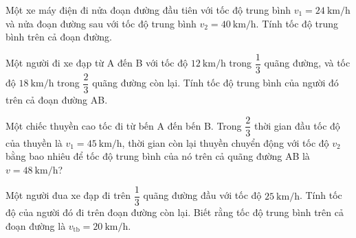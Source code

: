 \begin{ex}
	Một xe máy điện đi nửa đoạn đường đầu tiên với tốc độ trung bình $v_1 = \SI{24}{\kilo\meter/\hour}$ và nửa đoạn đường sau với tốc độ trung bình $v_2 = \SI{40}{\kilo\meter/\hour}$. Tính tốc độ trung bình trên cả đoạn đường.
\end{ex}

\begin{ex}
	Một người đi xe đạp từ A đến B với tốc độ $\SI{12}{\kilo\meter/\hour}$ trong $\dfrac{1}{3}$ quãng đường, và tốc độ $\SI{18}{\kilo\meter/\hour}$ trong $\dfrac{2}{3}$ quãng đường còn lại. Tính tốc độ trung bình của người đó trên cả đoạn đường AB.
\end{ex}

\begin{ex}
	Một chiếc thuyền cao tốc đi từ bến A đến bến B. Trong $\dfrac{2}{3}$ thời gian đầu tốc độ của thuyền là $v_1 = \SI{45}{\kilo\meter/\hour}$, thời gian còn lại thuyền chuyển động với tốc độ $v_2$ bằng bao nhiêu để tốc độ trung bình của nó trên cả quãng đường AB là $v = \SI{48}{\kilo\meter/\hour}$?
\end{ex}

\begin{ex}
	Một người đua xe đạp đi trên $\dfrac{1}{3}$ quãng đường đầu với tốc độ $\SI{25}{\kilo\meter/\hour}$. Tính tốc độ của người đó đi trên đoạn đường còn lại. Biết rằng tốc độ trung bình trên cả đoạn đường là $v_\text{tb} = \SI{20}{\kilo\meter/\hour}$.
\end{ex}

